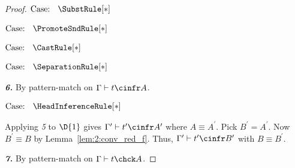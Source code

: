 \begin{proof}
    $\text{Case: }\begin{array}{c} \SubstRule[*] \end{array}$
    \begin{proofcase}
    \end{proofcase}

    $\text{Case: }\begin{array}{c} \PromoteSndRule[*] \end{array}$
    \begin{proofcase}
    \end{proofcase}

    $\text{Case: }\begin{array}{c} \CastRule[*] \end{array}$
    \begin{proofcase}
    \end{proofcase}

    $\text{Case: }\begin{array}{c} \SeparationRule[*] \end{array}$
    \begin{proofcase}
    \end{proofcase}

    \noindent \textbf{\textit{6.}}
    By pattern-match on $\Gamma \vdash t \cinfr A$.

    $\text{Case: }\begin{array}{c} \HeadInferenceRule[*] \end{array}$
    \begin{proofcase}
        Applying \textit{5} to $\D{1}$ gives $\Gamma^\prime \vdash t^\prime \cinfr A^\prime$ where $A \equiv A^\prime$.
        Pick $B^\prime = A^\prime$.
        Now $B^\prime \equiv B$ by Lemma~\ref{lem:2:conv_red_f}.
        Thus, $\Gamma^\prime \vdash t^\prime \cinfr B^\prime$ with $B \equiv B^\prime$.
    \end{proofcase}

    \noindent \textbf{\textit{7.}}
    By pattern-match on $\Gamma \vdash t \chck A$.


\end{proof}
